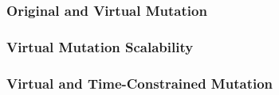 
\subsubsection{Original and Virtual Mutation}
\label{sec:empirical-study-RQ-original-virtual-time}



\subsubsection{Virtual Mutation Scalability}
\label{sec:empirical-study-RQ-mutants-tests}



\subsubsection{Virtual and Time-Constrained Mutation}
\label{sec:empirical-study-RQ-virtual-time-constrained-virtual}


